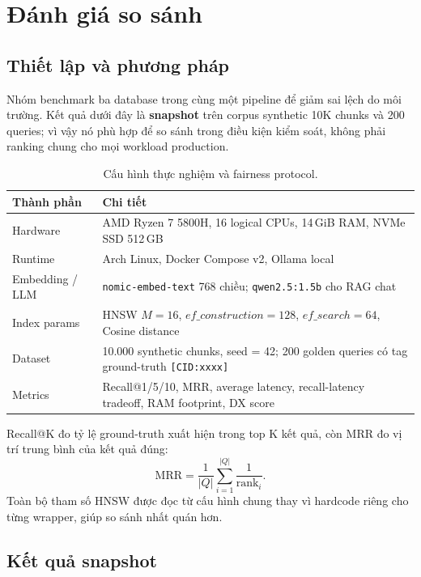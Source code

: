 \section{Đánh giá so sánh}
\label{sec:evaluation}

\subsection{Thiết lập và phương pháp}
\label{sec:experimental-setup}

Nhóm benchmark ba database trong cùng một pipeline để giảm sai lệch do môi trường. Kết quả dưới đây là \textbf{snapshot} trên corpus synthetic 10K chunks và 200 queries; vì vậy nó phù hợp để so sánh trong điều kiện kiểm soát, không phải ranking chung cho mọi workload production.

\begin{table}[H]
\centering
\caption{Cấu hình thực nghiệm và fairness protocol.}
\label{tab:experimental-setup}
\begin{tabular}{lp{9.6cm}}
\toprule
\textbf{Thành phần} & \textbf{Chi tiết} \\
\midrule
Hardware & AMD Ryzen 7 5800H, 16 logical CPUs, 14\,GiB RAM, NVMe SSD 512\,GB \\
Runtime & Arch Linux, Docker Compose v2, Ollama local \\
Embedding / LLM & \texttt{nomic-embed-text} 768 chiều; \texttt{qwen2.5:1.5b} cho RAG chat \\
Index params & HNSW $M=16$, $ef\_construction=128$, $ef\_search=64$, Cosine distance \\
Dataset & 10.000 synthetic chunks, seed = 42; 200 golden queries có tag ground-truth \texttt{[CID:xxxx]} \\
Metrics & Recall@1/5/10, MRR, average latency, recall-latency tradeoff, RAM footprint, DX score \\
\bottomrule
\end{tabular}
\end{table}

Recall@K đo tỷ lệ ground-truth xuất hiện trong top K kết quả, còn MRR đo vị trí trung bình của kết quả đúng:
\[
\text{MRR} = \frac{1}{|Q|}\sum_{i=1}^{|Q|}\frac{1}{\text{rank}_i}.
\]
Toàn bộ tham số HNSW được đọc từ cấu hình chung thay vì hardcode riêng cho từng wrapper, giúp so sánh nhất quán hơn.

\subsection{Kết quả snapshot}

